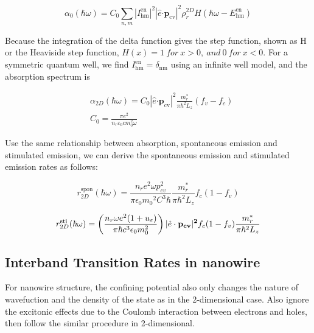 \begin{equation}
\alpha_{0}\left( \hbar\omega \right) = C_{0}\sum_{n,m}^{}\left| I_{\text{hm}}^{\text{en}} \right|^{2}\left| \hat{e}\bm{\cdot}\bm{p}_{\text{cv}} \right|^{2}\rho_{r}^{2D}H(\hbar\omega - E_{\text{hm}}^{\text{en}})
\end{equation}

Because the integration of the delta function gives the step function,
shown as H or the Heaviside step function,
\(H\left( x \right) = 1\ for\ x > 0,\ and\ 0\ for\ x < 0\). For a
symmetric quantum well, we find
\(I_{\text{hm}}^{\text{en}} = \delta_{\text{nm}}\) using an infinite
well model, and the absorption spectrum is

\begin{eqnarray}
  & \alpha_{2D}\left( \hbar\omega \right) = C_{0}\left| \hat{e}\bm{\cdot}\bm{p}_{\text{cv}} \right|^{2}\frac{m_{r}^{*}}{\pi\hbar^{2}L_{z}}(f_v-f_c) \nonumber \\
  & C_{0} = \frac{\pi e^{2}}{n_{r}\varepsilon_{0}cm_{0}^{2}\omega}
\end{eqnarray}

Use the same relationship between absorption, spontaneous emission and
stimulated emission, we can derive the spontaneous emission and stimulated
emission rates as follows:

\begin{equation}
r_{2D}^{\mathrm{spon}}(\hbar\omega)=\frac{n_re^2\omega{p_{cv}^2}}{{\pi}\epsilon_0{m_0}^2C^3{\hbar}}\frac{{m_r^\ast}}{\pi\hbar^2L_z}f_c(1-f_v)
\end{equation}

\begin{equation}
  r_{2D}^{\mathrm{sti}}(\hbar\omega)=\left(\frac{n_r\omega{e^2}(1+u_\varepsilon)}{\pi\hbar{c^3}\epsilon_0m_0^2}\right){|\hat{e}\cdot\bf{p}_{cv}|^2}f_c(1-f_v)\frac{m_r^\ast}{\pi\hbar^2{L_z}}
\end{equation}

\subsection{Interband Transition Rates in nanowire}\label{1DTR}

For nanowire structure, the confining potential also only changes the nature of
wavefuction and the density of the state as in the 2-dimensional case. Also
ignore the excitonic effects due to the Coulomb interaction between electrons
and holes, then follow the similar procedure in 2-dimensional.

